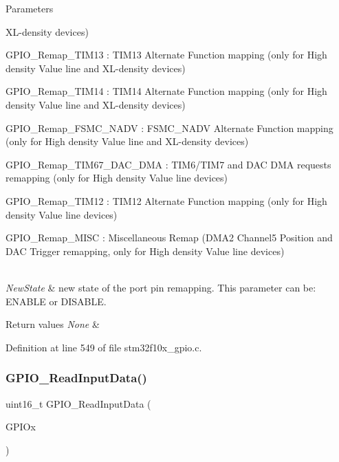 \begin{DoxyParams}{Parameters}
\begin{DoxyItemize}
X\+L-\/density devices) \item G\+P\+I\+O\+\_\+\+Remap\+\_\+\+T\+I\+M13 \+: T\+I\+M13 Alternate Function mapping (only for High density Value line and X\+L-\/density devices) \item G\+P\+I\+O\+\_\+\+Remap\+\_\+\+T\+I\+M14 \+: T\+I\+M14 Alternate Function mapping (only for High density Value line and X\+L-\/density devices) \item G\+P\+I\+O\+\_\+\+Remap\+\_\+\+F\+S\+M\+C\+\_\+\+N\+A\+DV \+: F\+S\+M\+C\+\_\+\+N\+A\+DV Alternate Function mapping (only for High density Value line and X\+L-\/density devices) \item G\+P\+I\+O\+\_\+\+Remap\+\_\+\+T\+I\+M67\+\_\+\+D\+A\+C\+\_\+\+D\+MA \+: T\+I\+M6/\+T\+I\+M7 and D\+AC D\+MA requests remapping (only for High density Value line devices) \item G\+P\+I\+O\+\_\+\+Remap\+\_\+\+T\+I\+M12 \+: T\+I\+M12 Alternate Function mapping (only for High density Value line devices) \item G\+P\+I\+O\+\_\+\+Remap\+\_\+\+M\+I\+SC \+: Miscellaneous Remap (D\+M\+A2 Channel5 Position and D\+AC Trigger remapping, only for High density Value line devices) \end{DoxyItemize}
\\
\hline
{\em New\+State} & new state of the port pin remapping. This parameter can be\+: E\+N\+A\+B\+LE or D\+I\+S\+A\+B\+LE. \\
\hline
\end{DoxyParams}

\begin{DoxyRetVals}{Return values}
{\em None} & \\
\hline
\end{DoxyRetVals}


Definition at line 549 of file stm32f10x\+\_\+gpio.\+c.

\mbox{\label{group___g_p_i_o___private___functions_ga139a33adc8409288e9f193bbebb5a0f7}} 
\subsubsection{\texorpdfstring{G\+P\+I\+O\+\_\+\+Read\+Input\+Data()}{GPIO\_ReadInputData()}}
{\footnotesize\ttfamily uint16\+\_\+t G\+P\+I\+O\+\_\+\+Read\+Input\+Data (\begin{DoxyParamCaption}\item[{\hyperlink{struct_g_p_i_o___type_def}{G\+P\+I\+O\+\_\+\+Type\+Def} $\ast$}]{G\+P\+I\+Ox }\end{DoxyParamCaption})}



